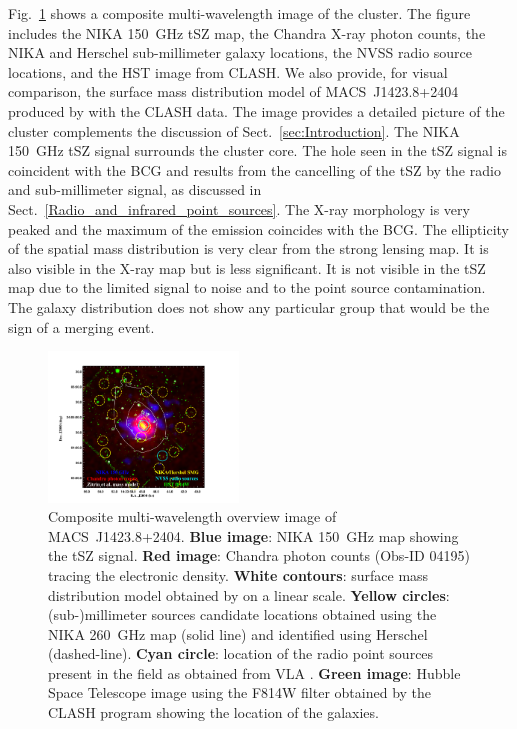 \documentclass[twocolumn,traditabstract]{aa}
\begin{document}
Fig.~\ref{fig:MACSJ1424_mutiw} shows a composite multi-wavelength image of the cluster. The figure includes the NIKA 150~GHz tSZ map, the Chandra X-ray photon counts, the NIKA and Herschel sub-millimeter galaxy locations, the NVSS radio source locations, and the HST image from CLASH. We also provide, for visual comparison, the surface mass distribution model of \mbox{MACS~J1423.8+2404} produced by \cite{zitrin2011} with the CLASH data. The image provides a detailed picture of the cluster complements the discussion of Sect.~\ref{sec:Introduction}. The NIKA 150~GHz  tSZ signal surrounds the cluster core. The hole seen in the tSZ signal is coincident with the BCG and results from the cancelling of the tSZ by the radio and sub-millimeter signal, as discussed in Sect.~\ref{Radio_and_infrared_point_sources}. The X-ray morphology is very peaked and the maximum of the emission coincides with the BCG. The ellipticity of the spatial mass distribution is very clear from the strong lensing map. It is also visible in the X-ray map but is less significant. It is not visible in the tSZ map due to the limited signal to noise and to the point source contamination. The galaxy distribution does not show any particular group that would be the sign of a merging event.
\begin{figure}[]
\centering
\includegraphics[trim=1cm 0cm 5cm 2cm, clip=true, width=0.45\textwidth]{Figure/MACSJ1424_multicolor.pdf}
\caption{\footnotesize Composite multi-wavelength overview image of \mbox{MACS~J1423.8+2404}. {\bf Blue image}: NIKA 150~GHz map showing the tSZ signal. {\bf Red image}: Chandra photon counts (Obs-ID 04195) tracing the electronic density. {\bf White contours}: surface mass distribution model obtained by \cite{zitrin2011} on a linear scale. {\bf Yellow circles}: (sub-)millimeter sources candidate locations obtained using the NIKA 260~GHz map (solid line) and identified using Herschel (dashed-line). {\bf Cyan circle}: location of the radio point sources present in the field as obtained from VLA \citep{laroque2003}. {\bf Green image}: Hubble Space Telescope image using the F814W filter obtained by the CLASH  program \citep{postman2012} showing the location of the galaxies.}
\label{fig:MACSJ1424_mutiw}
\end{figure}
\end{document}
